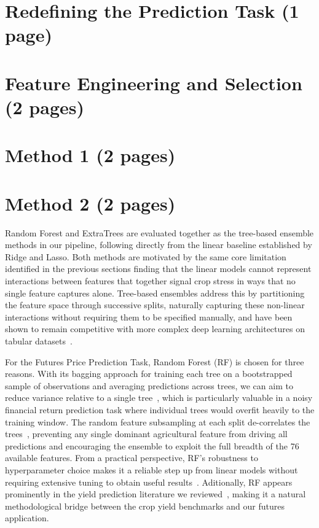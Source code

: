 \documentclass[pdflatex,sn-mathphys-num, oneside]{sn-jnl}%
\theoremstyle{thmstyleone}%
\theoremstyle{thmstyletwo}%
\theoremstyle{thmstylethree}%
\begin{document}
\clearpage

\section{Redefining the Prediction Task (1 page)}\label{sec3}

\clearpage

\section{Feature Engineering and Selection (2 pages)}\label{sec3}

\clearpage

\section{Method 1 (2 pages)}\label{sec3}


\clearpage

\section{Method 2 (2 pages)}\label{sec3}
Random Forest and ExtraTrees are evaluated together as the tree-based ensemble methods in our pipeline, following directly from the linear baseline established by Ridge and Lasso. Both methods are motivated by the same core limitation identified in the previous sections finding that the linear models cannot represent interactions between features that together signal crop stress in ways that no single feature captures alone. Tree-based ensembles address this by partitioning the feature space through successive splits, naturally capturing these non-linear interactions without requiring them to be specified manually, and have been shown to remain competitive with more complex deep learning architectures on tabular datasets~\cite{bib27}.

For the Futures Price Prediction Task, Random Forest (RF) is chosen for three reasons. With its bagging approach for training each tree on a bootstrapped sample of observations and averaging predictions across trees, we can aim to reduce variance relative to a single tree~\cite{bib24}, which is particularly valuable in a noisy financial return prediction task where individual trees would overfit heavily to the training window. The random feature subsampling at each split de-correlates the trees~\cite{bib24}, preventing any single dominant agricultural feature from driving all predictions and encouraging the ensemble to exploit the full breadth of the 76 available features. From a practical perspective, RF's robustness to hyperparameter choice makes it a reliable step up from linear models without requiring extensive tuning to obtain useful results~\cite{bib28}. Aditionally, RF appears prominently in the yield prediction literature we reviewed~\cite{bib14,bib16,bib17}, making it a natural methodological bridge between the crop yield benchmarks and our futures application.
\end{document}
